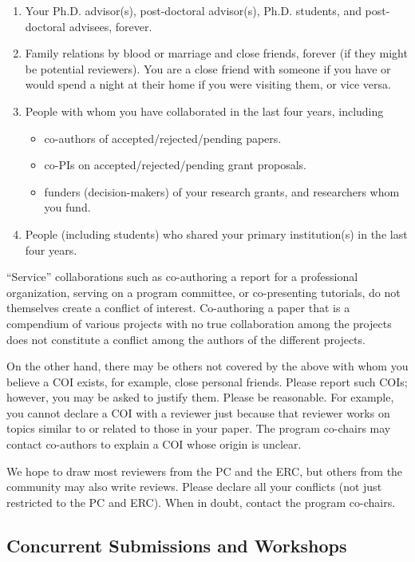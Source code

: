 \documentclass[pageno]{jpaper}
\begin{document}
\begin{enumerate}
\item Your Ph.D. advisor(s), post-doctoral advisor(s), Ph.D. students,
      and post-doctoral advisees, forever.
\item Family relations by blood or marriage and close friends, forever (if they might be potential reviewers). You are a close friend with someone if you have or would spend a night at their home if you were visiting them, or vice versa.
\item People with whom you have collaborated in the last four years, including
\begin{itemize}
\item co-authors of accepted/rejected/pending papers.
\item co-PIs on accepted/rejected/pending grant proposals.
\item funders (decision-makers) of your research grants, and researchers
      whom you fund.
\end{itemize}
\item People (including students) who shared your primary institution(s) in the
last four years.
\end{enumerate}

``Service'' collaborations such as co-authoring a report for a professional
organization, serving on a program committee, or co-presenting
tutorials, do not themselves create a conflict of interest.
Co-authoring a paper that is a compendium of various projects with
no true collaboration among the projects does not constitute a
conflict among the authors of the different projects.

On the other hand, there may be others not covered by the above with whom
you believe a COI exists, for example, close personal friends.
Please report such COIs; however, you may be asked to justify them.
Please be reasonable.	For example, you cannot declare a COI with a
reviewer just because that reviewer works on topics similar to or
related to those in your paper.
The program co-chairs may contact co-authors to explain a COI whose origin is unclear.

We hope to draw most reviewers from the PC and the ERC, but others from the
community may also write reviews.  Please declare all your conflicts (not
just restricted to the PC and ERC).  When in doubt, contact the program
co-chairs.

\subsection{Concurrent Submissions and Workshops}
\end{document}
